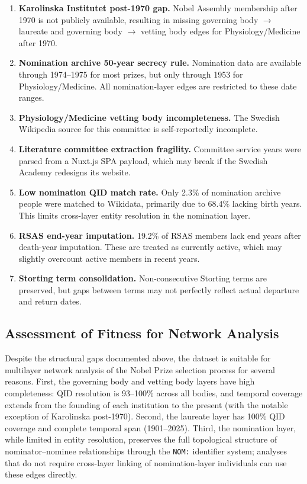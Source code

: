 \begin{enumerate}
    \item \textbf{Karolinska Institutet post-1970 gap.} Nobel Assembly
    membership after 1970 is not publicly available, resulting in missing
    governing body $\to$ laureate and governing body $\to$ vetting body
    edges for Physiology/Medicine after 1970.

    \item \textbf{Nomination archive 50-year secrecy rule.} Nomination
    data are available through 1974--1975 for most prizes, but only
    through 1953 for Physiology/Medicine. All nomination-layer edges are
    restricted to these date ranges.

    \item \textbf{Physiology/Medicine vetting body incompleteness.} The
    Swedish Wikipedia source for this committee is self-reportedly
    incomplete.

    \item \textbf{Literature committee extraction fragility.} Committee
    service years were parsed from a Nuxt.js SPA payload, which may
    break if the Swedish Academy redesigns its website.

    \item \textbf{Low nomination QID match rate.} Only 2.3\% of
    nomination archive people were matched to Wikidata, primarily due
    to 68.4\% lacking birth years. This limits cross-layer entity
    resolution in the nomination layer.

    \item \textbf{RSAS end-year imputation.} 19.2\% of RSAS members lack
    end years after death-year imputation. These are treated as currently
    active, which may slightly overcount active members in recent years.

    \item \textbf{Storting term consolidation.} Non-consecutive Storting
    terms are preserved, but gaps between terms may not perfectly reflect
    actual departure and return dates.
\end{enumerate}

\subsection{Assessment of Fitness for Network Analysis}

Despite the structural gaps documented above, the dataset is suitable for
multilayer network analysis of the Nobel Prize selection process for several
reasons. First, the governing body and vetting body layers have high
completeness: QID resolution is 93--100\% across all bodies, and temporal
coverage extends from the founding of each institution to the present (with
the notable exception of Karolinska post-1970). Second, the laureate layer
has 100\% QID coverage and complete temporal span (1901--2025). Third, the
nomination layer, while limited in entity resolution, preserves the full
topological structure of nominator--nominee relationships through the
\texttt{NOM:} identifier system; analyses that do not require cross-layer
linking of nomination-layer individuals can use these edges directly.

